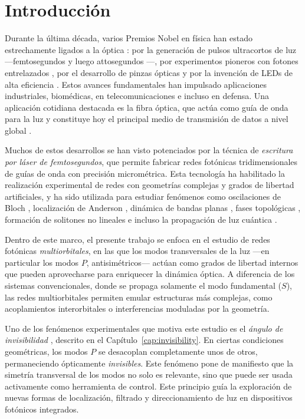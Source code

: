 \chapter{Introducción}

Durante la última década, varios Premios Nobel en física han estado estrechamente ligados a la óptica \cite{nobel}: por la generación de pulsos ultracortos de luz —femtosegundos \cite{femto1} y luego attosegundos \cite{atto1, atto2, atto3}—, por experimentos pioneros con fotones entrelazados \cite{photons1, photons2, photons3}, por el desarrollo de pinzas ópticas \cite{opticaltweezers} y por la invención de LEDs de alta eficiencia \cite{led1, led2, led3}. Estos avances fundamentales han impulsado aplicaciones industriales, biomédicas, en telecomunicaciones e incluso en defensa. Una aplicación cotidiana destacada es la fibra óptica, que actúa como guía de onda para la luz y constituye hoy el principal medio de transmisión de datos a nivel global \cite{fibra2, fibra}.

Muchos de estos desarrollos se han visto potenciados por la técnica de \textit{escritura por láser de femtosegundos}, que permite fabricar redes fotónicas tridimensionales de guías de onda con precisión micrométrica. Esta tecnología ha habilitado la realización experimental de redes con geometrías complejas y grados de libertad artificiales, y ha sido utilizada para estudiar fenómenos como oscilaciones de Bloch \cite{BlochOsci}, localización de Anderson \cite{Anderson}, dinámica de bandas planas \cite{lieb1, lieb2, artificialFB, FBdynamics}, fases topológicas \cite{obstopo, obsfloquet, topo1dphoto, toporusos}, formación de solitones no lineales \cite{discretesolitons} e incluso la propagación de luz cuántica \cite{qed, squeezed, topoquantum}.

Dentro de este marco, el presente trabajo se enfoca en el estudio de redes fotónicas \textit{multiorbitales}, en las que los modos transversales de la luz —en particular los modos \( P \), antisimétricos— actúan como grados de libertad internos que pueden aprovecharse para enriquecer la dinámica óptica. A diferencia de los sistemas convencionales, donde se propaga solamente el modo fundamental (\( S \)), las redes multiorbitales permiten emular estructuras más complejas, como acoplamientos interorbitales o interferencias moduladas por la geometría.

Uno de los fenómenos experimentales que motiva este estudio es el \textit{ángulo de invisibilidad} \cite{Pmodecoupling}, descrito en el Capítulo~\ref{cap:invisibility}. En ciertas condiciones geométricas, los modos \( P \) se desacoplan completamente unos de otros, permaneciendo ópticamente \textit{invisibles}. Este fenómeno pone de manifiesto que la simetría transversal de los modos no solo es relevante, sino que puede ser usada activamente como herramienta de control. Este principio guía la exploración de nuevas formas de localización, filtrado y direccionamiento de luz en dispositivos fotónicos integrados.

